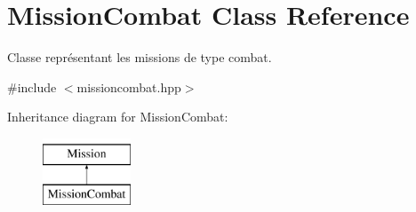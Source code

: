\hypertarget{class_mission_combat}{\section{Mission\-Combat Class Reference}
\label{class_mission_combat}
}


Classe représentant les missions de type combat.  




{\ttfamily \#include $<$missioncombat.\-hpp$>$}

Inheritance diagram for Mission\-Combat\-:\begin{figure}[H]
\begin{center}
\leavevmode
\includegraphics[height=2.000000cm]{class_mission_combat}
\end{center}
\end{figure}
